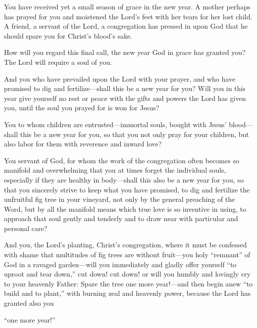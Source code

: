 You have received yet a small season of grace in the new year. A mother perhaps has prayed for you and moistened the Lord’s feet with her tears for her lost child. A friend, a servant of the Lord, a congregation has pressed in upon God that he should spare you for Christ’s blood’s sake.

How will you regard this final call, the new year God in grace has granted you? The Lord will require a soul of you.

And you who have prevailed upon the Lord with your prayer, and who have promised to dig and fertilize—shall this be a new year for you? Will you in this year give yourself no rest or peace with the gifts and powers the Lord has given you, until the soul you prayed for is won for Jesus?

You to whom children are entrusted—immortal souls, bought with Jesus’ blood—shall this be a new year for you, so that you not only pray for your children, but also labor for them with reverence and inward love?

You servant of God, for whom the work of the congregation often becomes so manifold and overwhelming that you at times forget the individual souls, especially if they are healthy in body—shall this also be a new year for you, so that you sincerely strive to keep what you have promised, to dig and fertilize the unfruitful fig tree in your vineyard, not only by the general preaching of the Word, but by all the manifold means which true love is so inventive in using, to approach that soul gently and tenderly and to draw near with particular and personal care?

And you, the Lord’s planting, Christ’s congregation, where it must be confessed with shame that multitudes of fig trees are without fruit—you holy “remnant” of God in a ravaged garden—will you immediately and gladly offer yourself “to uproot and tear down,” cut down! cut down! or will you humbly and lovingly cry to your heavenly Father: Spare the tree one more year!—and then begin anew “to build and to plant,” with burning zeal and heavenly power, because the Lord has granted also you

“one more year!”
